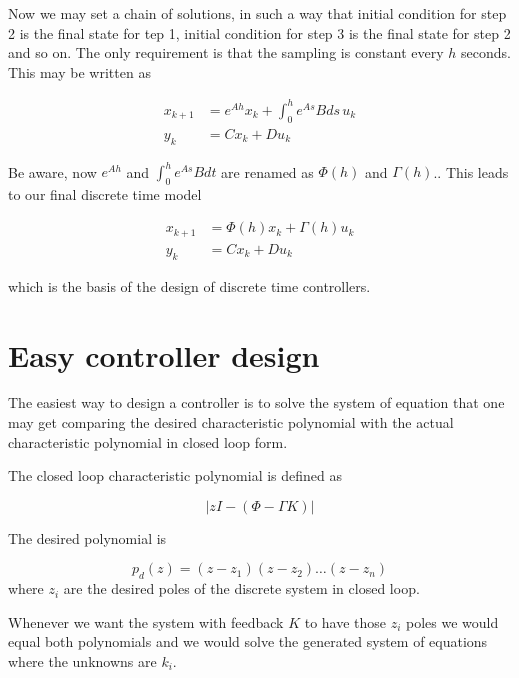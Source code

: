 \documentclass[nols]{tufte-handout}
\theoremstyle{definition}
\begin{document}
Now we may set a chain of solutions, in such a way that initial condition for step 2 is the final state for tep 1, initial condition for step 3 is the final state for step 2 and so on. The only requirement is that the sampling is constant every $h$ seconds. This may be written as

\begin{align}
    x_{k+1}&=e^{Ah}x_k+\int_0^h e^{As}Bds\,u_k\nonumber\\
    y_k&=Cx_k+Du_k\label{eq:modelo_discreto_3}
\end{align}

Be aware, now $e^{Ah}$  and $\displaystyle\int_0^h e^{As}Bdt$ are renamed as $\Phi(h)$ and $\Gamma(h)$.. This leads to our final discrete time model

\begin{align}
    x_{k+1}&=\Phi(h)x_{k}+\Gamma(h)u_k \nonumber\\
    y_k&=Cx_k+Du_k
\end{align}

which is the basis of the design of discrete time controllers.

\section{Easy controller design}

The easiest way to design a controller is to solve the system of equation that one may get comparing
the desired characteristic polynomial with the actual characteristic polynomial in closed loop form.

The closed loop characteristic polynomial is defined as 

\[
|zI-(\Phi-\Gamma K)|
\]

The desired polynomial is 

\[
p_d(z)=(z-z_1)(z-z_2)\ldots (z-z_n)
\]
where $z_i$ are the desired poles of the discrete system in closed loop.

Whenever we want the system with feedback $K$ to have those $z_i$ poles we would equal both polynomials and we would solve the generated system of equations where the unknowns are $k_i$.
\end{document}
